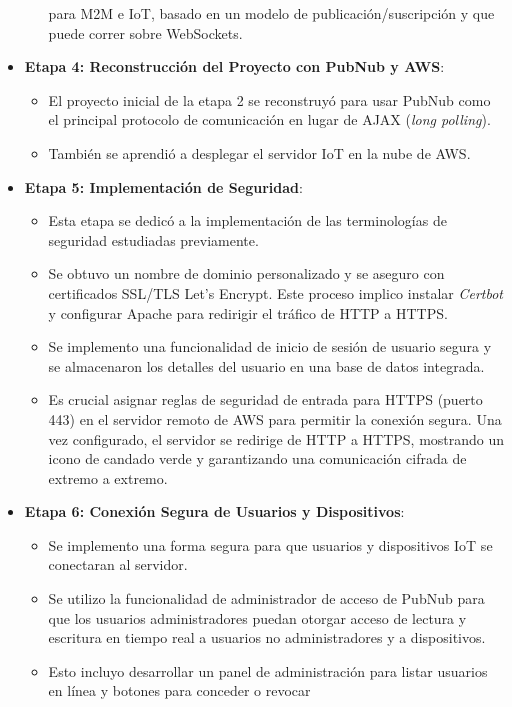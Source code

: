 \documentclass{report}
\begin{document}
\begin{itemize}
\begin{itemize}
        para M2M e IoT, basado en un modelo de publicación/suscripción y que puede correr sobre WebSockets.
    \end{itemize}
    \item \textbf{Etapa 4: Reconstrucción del Proyecto con PubNub y AWS}:
    \begin{itemize}
        \item El proyecto inicial de la etapa 2 se reconstruyó para usar PubNub como el principal protocolo de comunicación 
        en lugar de AJAX (\textit{long polling}).
        \item También se aprendió a desplegar el servidor IoT en la nube de AWS.
    \end{itemize}
    \item \textbf{Etapa 5: Implementación de Seguridad}:
    \begin{itemize}
        \item Esta etapa se dedicó a la implementación de las terminologías de seguridad estudiadas previamente.
        \item Se obtuvo un nombre de dominio personalizado y se aseguro con certificados SSL/TLS Let's Encrypt. Este proceso implico 
        instalar \textit{Certbot} y configurar Apache para redirigir el tráfico de HTTP a HTTPS.
        \item Se implemento una funcionalidad de inicio de sesión de usuario segura y se almacenaron los detalles del usuario en una 
        base de datos integrada.
        \item Es crucial asignar reglas de seguridad de entrada para HTTPS (puerto 443) en el servidor remoto de AWS para permitir 
        la conexión segura. Una vez configurado, el servidor se redirige de HTTP a HTTPS, mostrando un icono de candado verde y 
        garantizando una comunicación cifrada de extremo a extremo.
    \end{itemize}
    \item \textbf{Etapa 6: Conexión Segura de Usuarios y Dispositivos}:
    \begin{itemize}
        \item Se implemento una forma segura para que usuarios y dispositivos IoT se conectaran al servidor.
        \item Se utilizo la funcionalidad de administrador de acceso de PubNub para que los usuarios administradores puedan 
        otorgar acceso de lectura y escritura en tiempo real a usuarios no administradores y a dispositivos.
        \item Esto incluyo desarrollar un panel de administración para listar usuarios en línea y botones para conceder o revocar 

\end{itemize}
\end{itemize}
\end{document}
